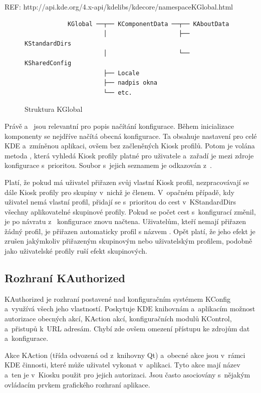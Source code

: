 REF: http://api.kde.org/4.x-api/kdelibs/kdecore/namespaceKGlobal.html

\begin{figure}[h]
    \centering
    \begin{verbatim}
            KGlobal ──┬── KComponentData ──┬── KAboutData
                      │                    ├── KStandardDirs
                      │                    └── KSharedConfig
                      ├── Locale
                      ├── nadpis okna
                      └── etc.\end{verbatim}
    \caption{Struktura KGlobal}
    \label{fig:kglobal}
\end{figure}

Právě  a~ jsou relevantní pro popis načítání konfigurace. Během inicializace komponenty se nejdříve načítá obecná konfigurace. Ta obsahuje nastavení pro celé KDE a~zmíněnou aplikaci, ovšem bez začleněných Kiosk profilů. Potom je volána metoda , která vyhledá Kiosk profily platné pro uživatele a~zařadí je mezi zdroje konfigurace s~prioritou. Soubor s~jejich seznamem je odkazován z~.

Platí, že pokud má uživatel přiřazen svůj vlastní Kiosk profil, nezpracovávají se dále Kiosk profily pro skupiny v~nichž je členem. V~opačném případě, kdy uživatel nemá vlastní profil, přidají se s~prioritou do cest v~KStandardDirs všechny aplikovatelné skupinové profily. Pokud se počet cest s~konfigurací změnil, je po návratu z~ konfigurace znovu načtena. Uživatelům, kteří nemají přiřazen žádný profil, je přiřazen automaticky profil s názvem . Opět platí, že jeho efekt je zrušen jakýmkoliv přiřazeným skupinovým nebo uživatelským profilem, podobně jako uživatelské profily ruší efekt skupinových.

\subsection*{Rozhraní KAuthorized}
KAuthorized je rozhraní postavené nad konfiguračním systémem KConfig a~využívá všech jeho vlastností. Poskytuje KDE knihovnám a~aplikacím možnost autorizace obecných akcí, KAction akcí, konfiguračních modulů KControl, a~přistupů k~URL adresám. Chybí zde ovšem omezení přístupu ke zdrojům dat a~konfigurace.

Akce KAction (třída  odvozená od  z~knihovny Qt) a~obecné akce jsou v~rámci KDE činnosti, které může uživatel vykonat v~aplikaci. Tyto akce mají název a~ten je v~Kiosku použit pro jejich autorizaci. Jsou často asociovány s~nějakým ovládacím prvkem grafického rozhraní aplikace.

